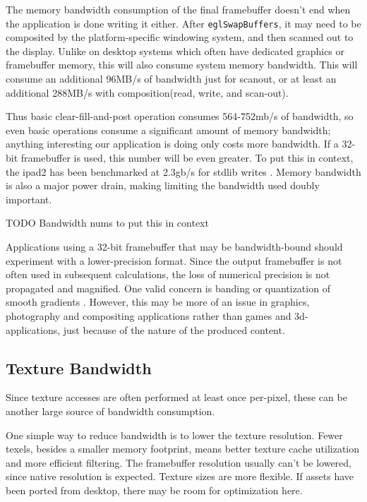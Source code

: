 The memory bandwidth consumption of the final framebuffer doesn't end when the application is done writing it either.  After \texttt{eglSwapBuffers}, it may need to be composited by the platform-specific windowing system, and then scanned out to the display.  Unlike on desktop systems which often have dedicated graphics or framebuffer memory, this will also consume system memory bandwidth.  This will consume an additional 96MB/s of bandwidth just for scanout, or at least an additional 288MB/s with composition(read, write, and scan-out).


Thus basic clear-fill-and-post operation consumes 564-752mb/s of bandwidth, so
even basic operations consume a significant amount of memory bandwidth;
anything interesting our application is doing only costs more bandwidth.  If a
32-bit framebuffer is used, this number will be even greater.  To put this in
context, the ipad2 has been benchmarked at 2.3gb/s for stdlib writes
\cite{anandtech_ipad2}.  Memory bandwidth is also a major power drain, making
limiting the bandwidth used doubly important.

TODO Bandwidth nums to put this in context


Applications using a 32-bit framebuffer that may be bandwidth-bound should experiment with a lower-precision format.  Since the output framebuffer is not often used in subsequent calculations, the loss of numerical precision is not propagated and magnified.  One valid concern is banding or quantization of smooth gradients \cite{32_bit_windows}.  However, this may be more of an issue in graphics, photography and compositing applications rather than games and 3d-applications, just because of the nature of the produced content.

\subsection{Texture Bandwidth}\label{JonMcCaffrey-Texture-Bandwidth}
Since texture accesses are often performed at least once per-pixel, these can be another large source of bandwidth consumption.


One simple way to reduce bandwidth is to lower the texture resolution.  Fewer texels, besides a smaller memory footprint, means better texture cache utilization and more efficient filtering.  The framebuffer resolution usually can't be lowered, since native resolution is expected.  Texture sizes are more flexible.  If assets have been ported from desktop, there may be room for optimization here.

